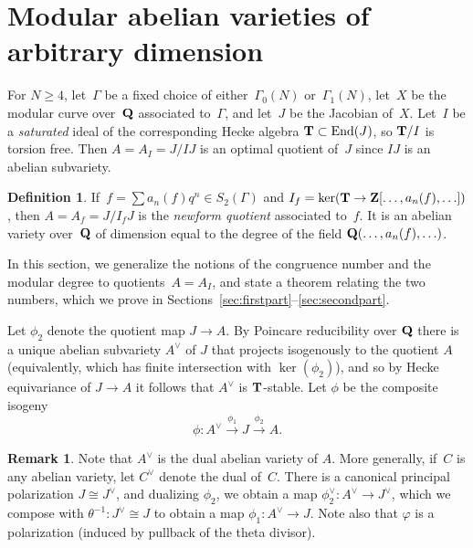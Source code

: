 \documentclass[10pt,twoside]{article}
\newcommand{\Z}{{\bf{Z}}}
\newcommand{\Q}{{\bf{Q}}}
\newcommand{\T}{{\bf{T}}}
\newcommand{\ra}{\rightarrow}
\newcommand{\lra}{\longrightarrow}
\newcommand{\vphi}{\varphi}
\newcommand{\po}{\phi_1}
\newcommand{\pt}{\phi_2}
\newcommand{\Adual}{A^{\vee}}
\newcommand{\Jdual}{J^{\vee}}
\newcommand{\End}{{\rm End}}
\theoremstyle{definition}
\newtheorem{defi}[lem]{Definition}
\newtheorem{rmk}[lem]{Remark}
\begin{document}

\section{Modular abelian varieties of arbitrary dimension}
\label{sec:quotients}
For $N\geq 4$, let~$\Gamma$ be a fixed choice of either~$\Gamma_0(N)$
or~$\Gamma_1(N)$, let~$X$ be the modular curve over~$\Q$ associated
to~$\Gamma$, and let~$J$ be the Jacobian of~$X$.  Let~$I$ be a {\em
  saturated} ideal of the corresponding Hecke algebra
$\T\subset\End(J)$, so $\T/ I$
is torsion free.  Then $A = A_I = J/IJ$ is an optimal quotient of~$J$
since $IJ$ is an abelian subvariety.

\begin{defi}
  If~$f=\sum a_n(f)q^n \in S_2(\Gamma)$ and $I_f=\ker(\T\to
  \Z[\ldots,a_n(f),\ldots])$, then $A=A_f=J/I_f J$ is the {\em newform
    quotient} associated to~$f$.  It is an abelian variety over~$\Q$
  of dimension equal to the degree of the field
  $\Q(\ldots,a_n(f),\ldots)$.
\end{defi}

In this section, we generalize the notions of the congruence number
and the modular degree to quotients~$A=A_I$, and state a theorem
relating the two numbers, which we prove in
Sections~\ref{sec:firstpart}--\ref{sec:secondpart}.

Let $\phi_2$ denote the quotient map $J \ra A$.  By Poincare
reducibility over $\Q$ there is a unique abelian subvariety $A^{\vee}$
of $J$ that projects isogenously to the quotient $A$ (equivalently,
which has finite intersection with $\ker(\phi_2)$), and so by Hecke
equivariance of $J \to A$ it follows that $A^{\vee}$ is $\T$-stable.
Let $\phi$ be the composite isogeny
$$
  \phi: \Adual \stackrel{\po}{\lra} J \stackrel{\pt}{\lra} A.
$$

\begin{rmk}
Note that $A^{\vee}$ is the dual abelian variety of $A$.  More
generally, if~$C$ is any abelian variety, let $C^{\vee}$ denote the
dual of~$C$.  There is a canonical principal polarization $J \cong
\Jdual$, and dualizing $\phi_2$, we obtain a map $\phi_2^\vee: \Adual
\ra \Jdual$, which we compose with $\theta^{-1}: \Jdual \cong J$ to
obtain a map $\po: \Adual \ra J$.  Note also that $\vphi$
is a polarization (induced by pullback of the theta divisor).
\end{rmk}
\end{document}
